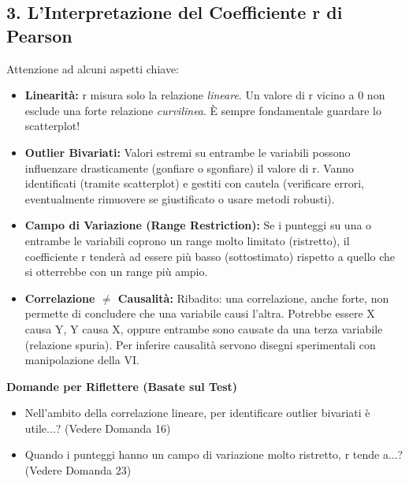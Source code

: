 \documentclass[12pt, a4paper]{article}
\newenvironment{reflectionbox}{%
    \medskip
    \begin{framed}\par\noindent
    \textbf{\color{boxtitlecolor}Domande per Riflettere (Basate sul Test)} \par
    \begin{itemize}[leftmargin=*, label=$\blacktriangleright$]
}{%
    \end{itemize}\par
    \end{framed}
    \medskip
}
\begin{document}
\subsection*{3. L'Interpretazione del Coefficiente r di Pearson}
Attenzione ad alcuni aspetti chiave:
\begin{itemize}
    \item \textbf{Linearità:} r misura solo la relazione \textit{lineare}. Un valore di r vicino a 0 non esclude una forte relazione \textit{curvilinea}. È sempre fondamentale guardare lo scatterplot!
    \item \textbf{Outlier Bivariati:} Valori estremi su entrambe le variabili possono influenzare drasticamente (gonfiare o sgonfiare) il valore di r. Vanno identificati (tramite scatterplot) e gestiti con cautela (verificare errori, eventualmente rimuovere se giustificato o usare metodi robusti).
    \item \textbf{Campo di Variazione (Range Restriction):} Se i punteggi su una o entrambe le variabili coprono un range molto limitato (ristretto), il coefficiente r tenderà ad essere più basso (sottostimato) rispetto a quello che si otterrebbe con un range più ampio.
    \item \textbf{Correlazione $\neq$ Causalità:} Ribadito: una correlazione, anche forte, non permette di concludere che una variabile causi l'altra. Potrebbe essere X causa Y, Y causa X, oppure entrambe sono causate da una terza variabile (relazione spuria). Per inferire causalità servono disegni sperimentali con manipolazione della VI.
\end{itemize}

\begin{reflectionbox}
    \item Nell'ambito della correlazione lineare, per identificare outlier bivariati è utile...? (Vedere Domanda 16)
    \item Quando i punteggi hanno un campo di variazione molto ristretto, r tende a...? (Vedere Domanda 23)
\end{reflectionbox}
\end{document}
